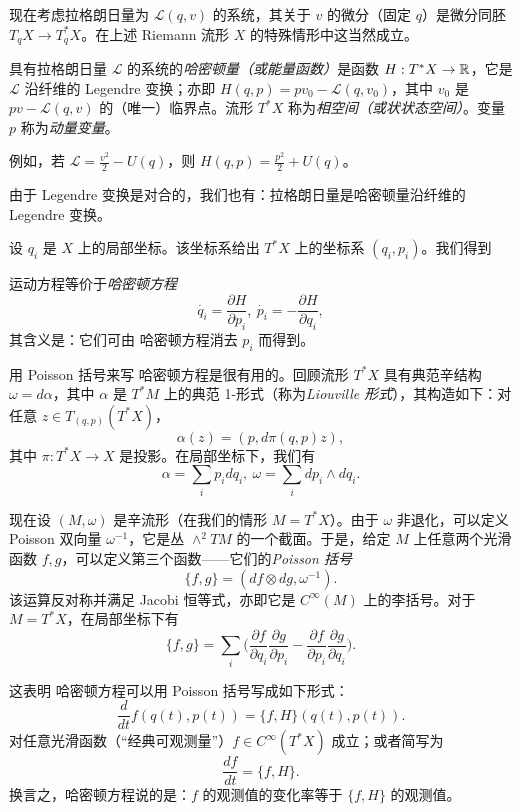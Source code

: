 现在考虑拉格朗日量为 ${\mathcal L}(q,v)$ 的系统，其关于 $v$ 的微分（固定 $q$）是微分同胚 $T_qX\to T^*_qX$。在上述 Riemann 流形 $X$ 的特殊情形中这当然成立。

\begin{definition}
具有拉格朗日量 ${\mathcal L}$ 的系统的\emph{哈密顿量（或能量函数）}是函数 $H: T^*X\to \Bbb R$，它是 ${\mathcal L}$ 沿纤维的 Legendre 变换；亦即 $H(q,p)=pv_0-{\mathcal L(q,v_0)}$，其中 $v_0$ 是 $pv-{\mathcal L(q,v)}$ 的（唯一）临界点。流形 $T^*X$ 称为\emph{相空间（或状状态空间）}。变量 $p$ 称为\emph{动量变量}。
\end{definition}

例如，若 ${\mathcal L}=\frac{v^2}{2}-U(q)$，则 $H(q,p)=\frac{p^2}{2}+U(q)$。

\begin{remark} 由于 Legendre 变换是对合的，我们也有：拉格朗日量是哈密顿量沿纤维的 Legendre 变换。
\end{remark}

设 $q_i$ 是 $X$ 上的局部坐标。该坐标系给出 $T^*X$ 上的坐标系 $(q_i,p_i)$。我们得到

\begin{proposition}
运动方程等价于\emph{哈密顿方程}
$$
\dot{q_i}=\frac{\partial H}{\partial p_i},\
\dot{p_i}=-\frac{\partial H}{\partial q_i},
$$
其含义是：它们可由 哈密顿方程消去 $p_i$ 而得到。
\end{proposition}

用 Poisson 括号来写 哈密顿方程是很有用的。回顾流形 $T^*X$ 具有典范辛结构 $\omega=d\alpha$，其中 $\alpha$ 是 $T^*M$ 上的典范 1-形式（称为\emph{Liouville 形式}），其构造如下：对任意 $z\in T_{(q,p)}(T^*X)$，
$$
\alpha(z)=(p,d\pi(q,p)z),
$$
其中 $\pi: T^*X\to X$ 是投影。在局部坐标下，我们有
$$
\alpha=\sum_i p_idq_i,\
\omega=\sum_i dp_i\wedge dq_i.
$$

现在设 $(M,\omega)$ 是辛流形（在我们的情形 $M=T^*X$）。由于 $\omega$ 非退化，可以定义 Poisson 双向量 $\omega^{-1}$，它是丛 $\wedge^2TM$ 的一个截面。于是，给定 $M$ 上任意两个光滑函数 $f,g$，可以定义第三个函数——它们的\emph{Poisson 括号}
$$
\lbrace{ f,g\rbrace}=(df\otimes dg,\omega^{-1}).
$$
该运算反对称并满足 Jacobi 恒等式，亦即它是 $C^\infty(M)$ 上的李括号。对于 $M=T^*X$，在局部坐标下有
$$
\lbrace{ f,g\rbrace}=\sum_i\biggl(\frac{\partial f}{\partial
  q_i}\frac{\partial g}{\partial p_i}-
\frac{\partial f}{\partial
  p_i}\frac{\partial g}{\partial q_i}\biggr).
$$

这表明 哈密顿方程可以用 Poisson 括号写成如下形式：
\begin{equation}\label{heobs}
\frac{d}{dt}f(q(t),p(t))=\lbrace{f,H\rbrace}(q(t),p(t)).
\end{equation}
对任意光滑函数（“经典可观测量”）$f\in C^\infty(T^*X)$ 成立；或者简写为
$$
\frac{df}{dt}=\lbrace f,H\rbrace.
$$
换言之，哈密顿方程说的是：$f$ 的观测值的变化率等于 $\lbrace{f,H\rbrace}$ 的观测值。

